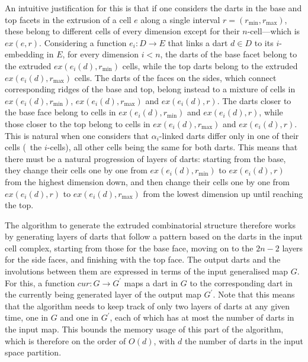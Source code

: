 An intuitive justification for this is that if one considers the darts in the base and top facets in the extrusion of a cell $e$ along a single interval $r = (r_{\min}, r_{\max})$, these belong to different cells of every dimension except for their $n$-cell---which is $ex(e, r)$.
Considering a function $e_i: D \rightarrow E$ that links a dart $d \in D$ to its $i$-embedding in $E$, for every dimension $i < n$, the darts of the base facet belong to the extruded $ex\left(e_i\left(d\right), r_{\min}\right)$ cells, while the top darts belong to the extruded $ex\left(e_i\left(d\right), r_{\max}\right)$ cells.
The darts of the faces on the sides, which connect corresponding ridges of the base and top, belong instead to a mixture of cells in $ex\left(e_i\left(d\right), r_{\min}\right)$, $ex\left(e_i\left(d\right), r_{\max}\right)$ and $ex\left(e_i\left(d\right), r\right)$.
The darts closer to the base face belong to cells in $ex\left(e_i\left(d\right), r_{\min}\right)$ and $ex\left(e_i\left(d\right), r\right)$, while those closer to the top belong to cells in $ex\left(e_i\left(d\right), r_{\max}\right)$ and $ex\left(e_i\left(d\right), r\right)$.
This is natural when one considers that $\alpha_i$-linked darts differ only in one of their cells (\ie\ the $i$-cells), all other cells being the same for both darts.
This means that there must be a natural progression of layers of darts: starting from the base, they change their cells one by one from $ex\left(e_i\left(d\right), r_{\min}\right)$ to $ex\left(e_i\left(d\right), r\right)$ from the highest dimension down, and then change their cells one by one from $ex\left(e_i\left(d\right), r\right)$ to $ex\left(e_i\left(d\right), r_{\max}\right)$ from the lowest dimension up until reaching the top.

The algorithm to generate the extruded combinatorial structure therefore works by generating layers of darts that follow a pattern based on the darts in the input cell complex, starting from those for the base face, moving on to the $2n-2$ layers for the side faces, and finishing with the top face.
The output darts and the involutions between them are expressed in terms of the input generalised map $G$.
For this, a function $cur: G \rightarrow G^\prime$ maps a dart in $G$ to the corresponding dart in the currently being generated layer of the output map $G^\prime$.
Note that this means that the algorithm needs to keep track of only two layers of darts at any given time, one in $G$ and one in $G^\prime$, each of which has at most the number of darts in the input map.
This bounds the memory usage of this part of the algorithm, which is therefore on the order of $O(d)$, with $d$ the number of darts in the input space partition.

